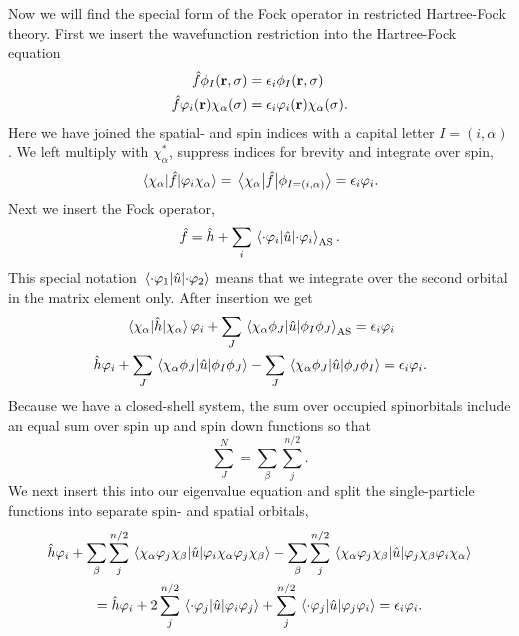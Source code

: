 Now we will find the special form of the Fock operator in restricted 
Hartree-Fock theory. First we insert the wavefunction restriction into 
the Hartree-Fock equation
\begin{equation}
    \begin{aligned}
        \hat{f}\phi_I(\vb{r}, \sigma) &= \epsilon_i \phi_I(\vb{r}, \sigma) \\
        \hat{f}\varphi_i(\vb{r}) \chi_\alpha(\sigma)
        &= \epsilon_i \varphi_i(\vb{r})\chi_\alpha(\sigma).
    \end{aligned}
\end{equation}
Here we have joined the spatial- and spin indices with a capital letter $I = (i, \alpha)$.
We left multiply with $\chi_\alpha^*$, suppress indices for brevity and integrate over spin,
\begin{equation}
    \mel{\chi_\alpha}{\hat{f}}{\varphi_i\chi_\alpha}
    = \mel{\chi_\alpha}{\hat{f}}{\phi_{I = (i,\alpha)}}
    = \epsilon_i\varphi_i.
\end{equation}
Next we insert the Fock operator,
\begin{equation*}
    \hat{f} = \hat{h} + \sum_i\mel{\cdot\varphi_i}{\hat{u}}{\cdot\varphi_i}_\text{AS}.
\end{equation*} 
This special notation $\mel{\cdot\varphi_1}{\hat{u}}{\cdot\varphi_2}$ means that we
integrate over the second orbital in the matrix element only. After insertion we get
\begin{equation}
   \begin{gathered}
        \mel{\chi_\alpha}{\hat{h}}{\chi_\alpha}\varphi_i
        + \sum_J \mel{\chi_\alpha\phi_J}{\hat{u}}{\phi_I\phi_J}_\text{AS}
        = \epsilon_i\varphi_i \\
        \hat{h}\varphi_i 
        + \sum_J \mel{\chi_\alpha\phi_J}{\hat{u}}{\phi_I\phi_J}
        - \sum_J \mel{\chi_\alpha\phi_J}{\hat{u}}{\phi_J\phi_I}
        = \epsilon_i\varphi_i.
   \end{gathered} 
\end{equation}
Because we have a closed-shell system, the sum over occupied spinorbitals include an 
equal sum over spin up and spin down functions so that
\begin{equation*}
    \sum_J^N = \sum_\beta\sum_j^{n/2}.
\end{equation*} 
We next insert this into our eigenvalue equation and split the single-particle functions 
into separate spin- and spatial orbitals,
\begin{equation}
    \begin{gathered}
        \hat{h}\varphi_i 
        + \sum_\beta\sum_j^{n/2}
            \mel{\chi_\alpha\varphi_j\chi_\beta}{\hat{u}}{\varphi_i\chi_\alpha\varphi_j\chi_\beta} 
        - \sum_\beta\sum_j^{n/2}
            \mel{\chi_\alpha\varphi_j\chi_\beta}{\hat{u}}{\varphi_j\chi_\beta\varphi_i\chi_\alpha} \\
        = \hat{h}\varphi_i 
        + 2\sum_j^{n/2} \mel{\cdot \varphi_j}{\hat{u}}{\varphi_i\varphi_j}
        +  \sum_j^{n/2} \mel{\cdot \varphi_j}{\hat{u}}{\varphi_j\varphi_i}
        = \epsilon_i\varphi_i.
    \end{gathered}
\end{equation}

